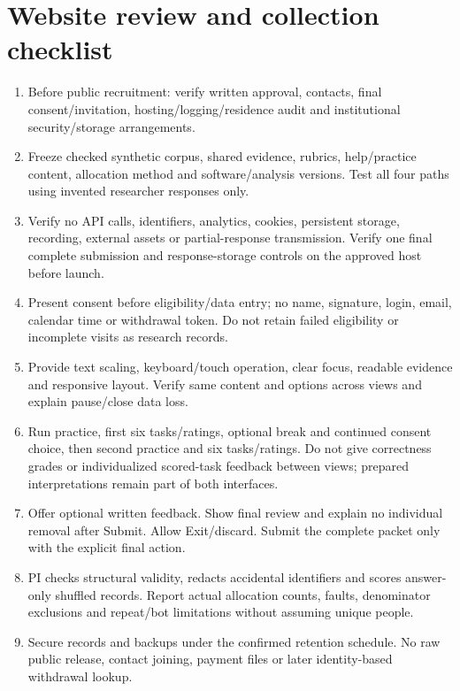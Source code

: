 \documentclass[11pt,letterpaper]{article}
\begin{document}
\section{Website review and collection checklist}\label{app:session}
\begin{enumerate}
\item Before public recruitment: verify written approval, contacts, final consent/invitation, hosting/logging/residence audit and institutional security/storage arrangements.
\item Freeze checked synthetic corpus, shared evidence, rubrics, help/practice content, allocation method and software/analysis versions. Test all four paths using invented researcher responses only.
\item Verify no API calls, identifiers, analytics, cookies, persistent storage, recording, external assets or partial-response transmission. Verify one final complete submission and response-storage controls on the approved host before launch.
\item Present consent before eligibility/data entry; no name, signature, login, email, calendar time or withdrawal token. Do not retain failed eligibility or incomplete visits as research records.
\item Provide text scaling, keyboard/touch operation, clear focus, readable evidence and responsive layout. Verify same content and options across views and explain pause/close data loss.
\item Run practice, first six tasks/ratings, optional break and continued consent choice, then second practice and six tasks/ratings. Do not give correctness grades or individualized scored-task feedback between views; prepared interpretations remain part of both interfaces.
\item Offer optional written feedback. Show final review and explain no individual removal after Submit. Allow Exit/discard. Submit the complete packet only with the explicit final action.
\item PI checks structural validity, redacts accidental identifiers and scores answer-only shuffled records. Report actual allocation counts, faults, denominator exclusions and repeat/bot limitations without assuming unique people.
\item Secure records and backups under the confirmed retention schedule. No raw public release, contact joining, payment files or later identity-based withdrawal lookup.
\end{enumerate}
\end{document}
